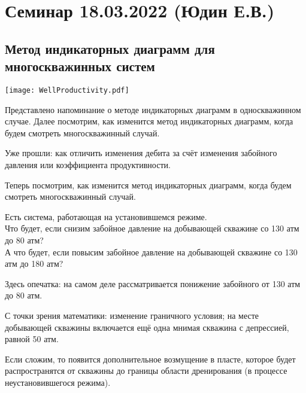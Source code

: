 \documentclass[main.tex]{subfiles}
\begin{document}
\section{Семинар 18.03.2022 (Юдин Е.В.)}

\subsection{Метод индикаторных диаграмм для многоскважинных систем}

\texttt{[image: WellProductivity.pdf]}

Представлено напоминание о методе индикаторных диаграмм в односкважинном случае. Далее посмотрим, как изменится метод индикаторных диаграмм, когда будем смотреть многоскважинный случай.

Уже прошли: как отличить изменения дебита за счёт изменения забойного давления или коэффициента продуктивности.

Теперь посмотрим, как изменится метод индикаторных диаграмм, когда будем смотреть многоскважинный случай.


Есть система, работающая на установившемся режиме.\\

Что будет, если снизим забойное давление на добывающей скважине со 130 атм до 80 атм?\\

А что будет, если повысим забойное давление на добывающей скважине со 130 атм до 180 атм?\\


Здесь опечатка: на самом деле рассматривается понижение забойного от 130 атм до 80 атм.

С точки зрения математики: изменение граничного условия; на месте добывающей скважины включается ещё одна мнимая скважина с депрессией, равной 50 атм.

Если сложим, то появится дополнительное возмущение в пласте, которое будет распространятся от скважины до границы области дренирования (в процессе неустановившегося режима).
\end{document}
